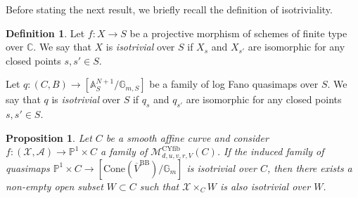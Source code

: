 \documentclass[12pt,twoside]{amsart}
\newtheorem{prop}[thm]{Proposition}
\theoremstyle{definition}
\newtheorem{defn}[thm]{Definition}
\begin{document}
Before stating the next result, we briefly recall the definition of isotriviality.
\begin{defn}\label{defn--isotrivial}
    Let $f\colon X\to S$ be a projective morphism of schemes of finite type over $\mathbb{C}$.
    We say that $X$ is {\it isotrivial} over $S$ if $X_s$ and $X_{s'}$ are isomorphic for any closed points $s,s'\in S$.

    Let $q\colon (C,B)\to [\mathbb{A}^{N+1}_S/\mathbb{G}_{m,S}]$ be a family of log Fano quasimaps over $S$.
    We say that $q$ is {\it isotrivial} over $S$ if $q_s$ and $q_{s'}$ are isomorphic for any closed points $s,s'\in S$.
\end{defn}



\begin{prop}\label{prop--isotrivial--fibers}
Let $C$ be a smooth affine curve and consider $f\colon(\mathcal{X},\mathcal{A})\to\mathbb{P}^1\times C$ a family of $\mathcal{M}^{\mathrm{CYfib}}_{d,u,v,r,V}(C)$.
If the induced family of quasimaps $\mathbb{P}^1\times C\to[\mathrm{Cone}(\overline{V}^{\mathrm{BB}})/\mathbb{G}_m]$ is isotrivial over $C$, then there exists a non-empty open subset $W\subset C$ such that $\mathcal{X}\times_CW$ is also isotrivial over $W$.\label{prop--quasi-finiteness}
\end{prop}
\end{document}
